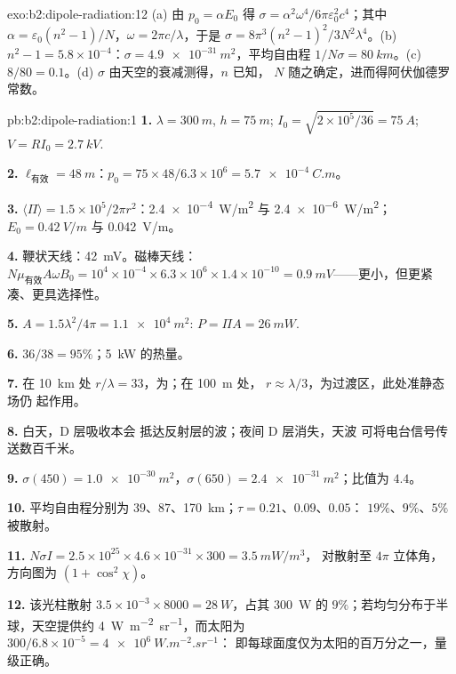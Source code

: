 \begin{solution}{exo:b2:dipole-radiation:12}
(a) 由 $p_0 = \alpha E_0$ 得 $\sigma = \alpha^2\omega^4/6\pi\varepsilon_0^2c^4$；其中 $\alpha = \varepsilon_0(n^2
- 1)/N$，$\omega = 2\pi c/\lambda$，于是 $\sigma = 8\pi^3(n^2 - 1)^2/3N^2\lambda^4$。(b) $n^2 - 1 =
5.8 \times 10^{-4}$：$\sigma = \qty{4.9e-31}{m^2}$，平均自由程 $1/N\sigma = \qty{80}{km}$。(c)
$8/80 = 0.1$。(d) $\sigma$ 由天空的衰减测得，$n$ 已知，
$N$ 随之确定，进而得阿伏伽德罗常数。
\end{solution}

\begin{solution}{pb:b2:dipole-radiation:1}
\textbf{1.} $\lambda = \qty{300}{m}$, $h = \qty{75}{m}$; $I_0 = \sqrt{2 \times 10^5/36} = \qty{75}{A}$;
$V = RI_0 = \qty{2.7}{kV}$.

\textbf{2.} $\ell_{\text{有效}} = \qty{48}{m}$：$p_0 = 75 \times 48/6.3 \times 10^6 = \qty{5.7e-4}{C.m}$。

\textbf{3.} $\langle\Pi\rangle = 1.5 \times 10^5/2\pi r^2$：\qty{2.4e-4}{W/m^2} 与 \qty{2.4e-6}{W/m^2}；
$E_0 = \qty{0.42}{V/m}$ 与 \qty{0.042}{V/m}。

\textbf{4.} 鞭状天线：\qty{42}{mV}。磁棒天线：$N\mu_{\text{有效}}A\omega B_0 = 10^4 \times 10^{-4} \times 6.3 \times
10^6 \times 1.4 \times 10^{-10} = \qty{0.9}{mV}$——更小，但更紧凑、更具选择性。

\textbf{5.} $A = 1.5\lambda^2/4\pi = \qty{1.1e4}{m^2}$: $P = \Pi A = \qty{26}{mW}$.

\textbf{6.} $36/38 = 95\%$；\qty{5}{kW} 的热量。

\textbf{7.} 在 \qty{10}{km} 处 $r/\lambda = 33$，为；在 \qty{100}{m} 处，
$r \approx \lambda/3$，为过渡区，此处准静态场仍
起作用。

\textbf{8.} 白天，D 层吸收本会
抵达反射层的波；夜间 D 层消失，天波
可将电台信号传送数百千米。

\textbf{9.} $\sigma(450) = \qty{1.0e-30}{m^2}$，$\sigma(650) = \qty{2.4e-31}{m^2}$；比值为 $4.4$。

\textbf{10.} 平均自由程分别为 $39$、$87$、\qty{170}{km}；$\tau = 0.21$、$0.09$、$0.05$：
$19\%$、$9\%$、$5\%$ 被散射。

\textbf{11.} $N\sigma I = 2.5 \times 10^{25} \times 4.6 \times 10^{-31} \times 300 = \qty{3.5}{mW/m^3}$，
对散射至 $4\pi$ 立体角，方向图为 $(1 + \cos^2\chi)$。

\textbf{12.} 该光柱散射 $3.5 \times 10^{-3} \times 8000 = \qty{28}{W}$，占其
\qty{300}{W} 的 $9\%$；若均匀分布于半球，天空提供约
\qty{4}{W.m^{-2}.sr^{-1}}，而太阳为 $300/6.8 \times 10^{-5} = \qty{4e6}{W.m^{-2}.sr^{-1}}$：
即每球面度仅为太阳的百万分之一，量级正确。


\end{solution}

